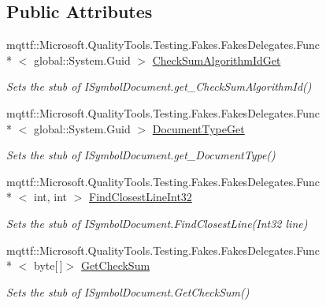 \subsection*{Public Attributes}
\begin{DoxyCompactItemize}
\item 
mqttf\-::\-Microsoft.\-Quality\-Tools.\-Testing.\-Fakes.\-Fakes\-Delegates.\-Func\\*
$<$ global\-::\-System.\-Guid $>$ \hyperlink{class_system_1_1_diagnostics_1_1_symbol_store_1_1_fakes_1_1_stub_i_symbol_document_ac870c7e816e7e1d820aed8c01c46c2aa}{Check\-Sum\-Algorithm\-Id\-Get}
\begin{DoxyCompactList}\small\item\em Sets the stub of I\-Symbol\-Document.\-get\-\_\-\-Check\-Sum\-Algorithm\-Id()\end{DoxyCompactList}\item 
mqttf\-::\-Microsoft.\-Quality\-Tools.\-Testing.\-Fakes.\-Fakes\-Delegates.\-Func\\*
$<$ global\-::\-System.\-Guid $>$ \hyperlink{class_system_1_1_diagnostics_1_1_symbol_store_1_1_fakes_1_1_stub_i_symbol_document_aa58fd2cc26a0c92f354b88b2c4a7d0a9}{Document\-Type\-Get}
\begin{DoxyCompactList}\small\item\em Sets the stub of I\-Symbol\-Document.\-get\-\_\-\-Document\-Type()\end{DoxyCompactList}\item 
mqttf\-::\-Microsoft.\-Quality\-Tools.\-Testing.\-Fakes.\-Fakes\-Delegates.\-Func\\*
$<$ int, int $>$ \hyperlink{class_system_1_1_diagnostics_1_1_symbol_store_1_1_fakes_1_1_stub_i_symbol_document_a5a391bf80728f680baabd8cfd32566f0}{Find\-Closest\-Line\-Int32}
\begin{DoxyCompactList}\small\item\em Sets the stub of I\-Symbol\-Document.\-Find\-Closest\-Line(\-Int32 line)\end{DoxyCompactList}\item 
mqttf\-::\-Microsoft.\-Quality\-Tools.\-Testing.\-Fakes.\-Fakes\-Delegates.\-Func\\*
$<$ byte\mbox{[}$\,$\mbox{]}$>$ \hyperlink{class_system_1_1_diagnostics_1_1_symbol_store_1_1_fakes_1_1_stub_i_symbol_document_a36001ac94bdc146a82e31ea6b24ff8e4}{Get\-Check\-Sum}
\begin{DoxyCompactList}\small\item\em Sets the stub of I\-Symbol\-Document.\-Get\-Check\-Sum()\end{DoxyCompactList}\item 

\end{DoxyCompactItemize}
